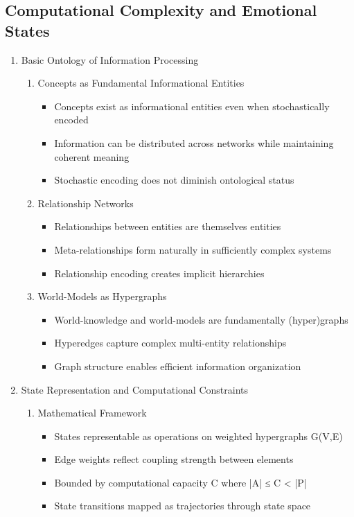 \documentclass[12pt,letterpaper]{article}
\begin{document}
\subsection{Computational Complexity and Emotional States}
\begin{enumerate}
    \item Basic Ontology of Information Processing
    \begin{enumerate}
        \item Concepts as Fundamental Informational Entities
        \begin{itemize}
            \item Concepts exist as informational entities even when stochastically encoded
            \item Information can be distributed across networks while maintaining coherent meaning
            \item Stochastic encoding does not diminish ontological status
        \end{itemize}
        \item Relationship Networks
        \begin{itemize}
            \item Relationships between entities are themselves entities
            \item Meta-relationships form naturally in sufficiently complex systems
            \item Relationship encoding creates implicit hierarchies
        \end{itemize}
        \item World-Models as Hypergraphs
        \begin{itemize}
            \item World-knowledge and world-models are fundamentally (hyper)graphs
            \item Hyperedges capture complex multi-entity relationships
            \item Graph structure enables efficient information organization
        \end{itemize}
    \end{enumerate}

    \item State Representation and Computational Constraints
    \begin{enumerate}
        \item Mathematical Framework
        \begin{itemize}
            \item States representable as operations on weighted hypergraphs G(V,E)
            \item Edge weights reflect coupling strength between elements
            \item Bounded by computational capacity C where |A| ≤ C < |P|
            \item State transitions mapped as trajectories through state space
        \end{itemize}
        

\end{enumerate}
\end{enumerate}
\end{document}
